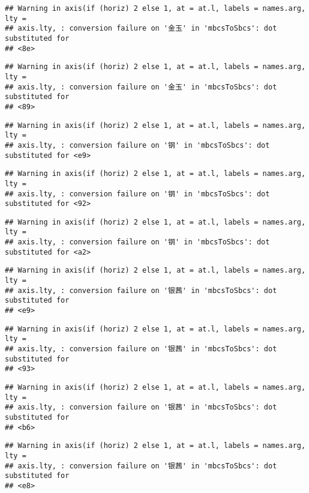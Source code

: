 \documentclass[
]{article}
\begin{document}
\begin{verbatim}
## Warning in axis(if (horiz) 2 else 1, at = at.l, labels = names.arg, lty =
## axis.lty, : conversion failure on '金玉' in 'mbcsToSbcs': dot substituted for
## <8e>
\end{verbatim}

\begin{verbatim}
## Warning in axis(if (horiz) 2 else 1, at = at.l, labels = names.arg, lty =
## axis.lty, : conversion failure on '金玉' in 'mbcsToSbcs': dot substituted for
## <89>
\end{verbatim}

\begin{verbatim}
## Warning in axis(if (horiz) 2 else 1, at = at.l, labels = names.arg, lty =
## axis.lty, : conversion failure on '钢' in 'mbcsToSbcs': dot substituted for <e9>
\end{verbatim}

\begin{verbatim}
## Warning in axis(if (horiz) 2 else 1, at = at.l, labels = names.arg, lty =
## axis.lty, : conversion failure on '钢' in 'mbcsToSbcs': dot substituted for <92>
\end{verbatim}

\begin{verbatim}
## Warning in axis(if (horiz) 2 else 1, at = at.l, labels = names.arg, lty =
## axis.lty, : conversion failure on '钢' in 'mbcsToSbcs': dot substituted for <a2>
\end{verbatim}

\begin{verbatim}
## Warning in axis(if (horiz) 2 else 1, at = at.l, labels = names.arg, lty =
## axis.lty, : conversion failure on '银茜' in 'mbcsToSbcs': dot substituted for
## <e9>
\end{verbatim}

\begin{verbatim}
## Warning in axis(if (horiz) 2 else 1, at = at.l, labels = names.arg, lty =
## axis.lty, : conversion failure on '银茜' in 'mbcsToSbcs': dot substituted for
## <93>
\end{verbatim}

\begin{verbatim}
## Warning in axis(if (horiz) 2 else 1, at = at.l, labels = names.arg, lty =
## axis.lty, : conversion failure on '银茜' in 'mbcsToSbcs': dot substituted for
## <b6>
\end{verbatim}

\begin{verbatim}
## Warning in axis(if (horiz) 2 else 1, at = at.l, labels = names.arg, lty =
## axis.lty, : conversion failure on '银茜' in 'mbcsToSbcs': dot substituted for
## <e8>
\end{verbatim}
\end{document}
